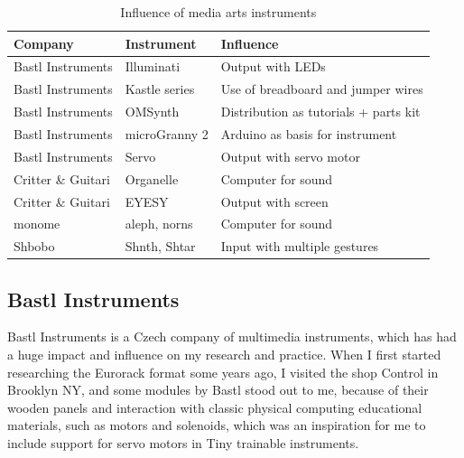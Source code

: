 \begin{table}[ht]
    \centering
    \begin{tabular}{ | l |  l | l |}
        \hline
        Company             & Instrument    & Influence                             \\
        \hline
        Bastl Instruments   & Illuminati    & Output with LEDs                      \\
        Bastl Instruments   & Kastle series & Use of breadboard and jumper wires    \\
        Bastl Instruments   & OMSynth       & Distribution as tutorials + parts kit \\
        Bastl Instruments   & microGranny 2 & Arduino as basis for instrument       \\
        Bastl Instruments   & Servo         & Output with servo motor               \\
        Critter \& Guitari  & Organelle     & Computer for sound                    \\
        Critter \& Guitari  & EYESY         & Output with screen                    \\
        monome              & aleph, norns  & Computer for sound                    \\
        Shbobo              & Shnth, Shtar  & Input with multiple gestures          \\
        \hline
    \end{tabular}
    \caption{Influence of media arts instruments}
    \label{table:media-arts-instruments-influence}
\end{table}{}

\subsection{Bastl Instruments}

Bastl Instruments is a Czech company of multimedia instruments, which has had a huge impact and influence on my research and practice. When I first started researching the Eurorack format some years ago, I visited the shop Control in Brooklyn NY, and some modules by Bastl stood out to me, because of their wooden panels and interaction with classic physical computing educational materials, such as motors and solenoids, which was an inspiration for me to include support for servo motors in Tiny trainable instruments.

